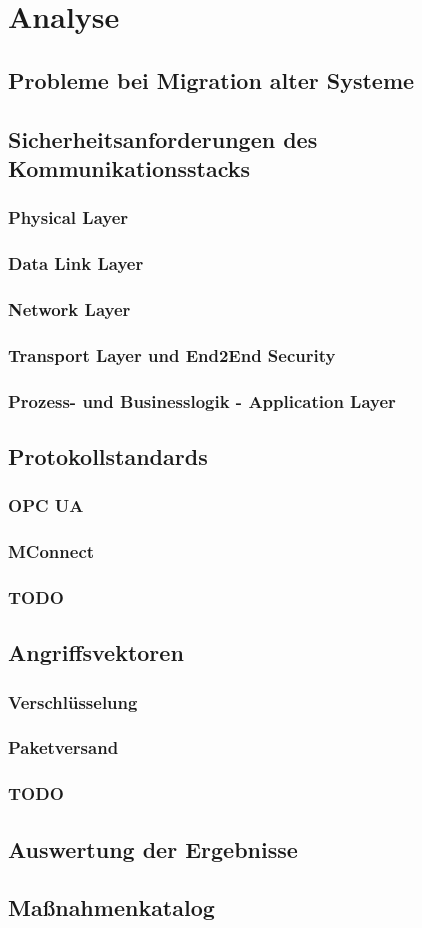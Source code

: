 \chapter{Analyse}
\section{Probleme bei Migration alter Systeme}

\section{Sicherheitsanforderungen des Kommunikationsstacks}
\subsection{Physical Layer}
\subsection{Data Link Layer}
\subsection{Network Layer}
\subsection{Transport Layer und End2End Security}
\subsection{Prozess- und Businesslogik - Application Layer}

\section{Protokollstandards}
\subsection{OPC UA}
\subsection{MConnect}
\subsection{TODO}

\section{Angriffsvektoren}
\subsection{Verschlüsselung}
\subsection{Paketversand}
\subsection{TODO}

\section{Auswertung der Ergebnisse}

\section{Maßnahmenkatalog}